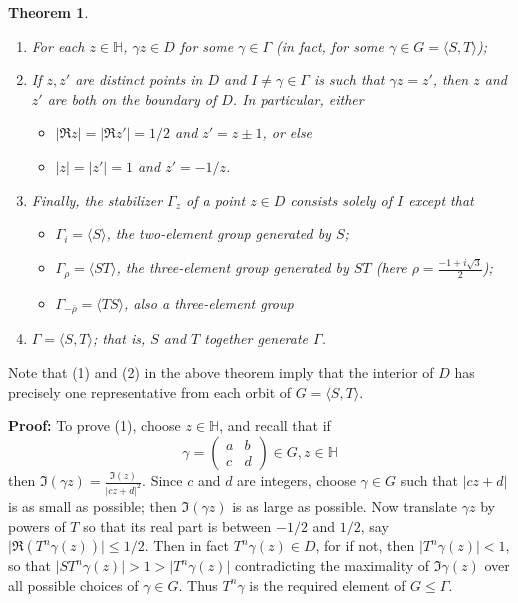 \documentclass[12pt]{article}
\newcommand{\Half}{\mathbb{H}}
\newtheorem{thm}{Theorem}
\begin{document}
\begin{thm}\ 
\newline
\begin{enumerate}
\item For each $z\in\Half$, $\gamma z\in D$ for some $\gamma\in\Gamma$ (in fact, for some $\gamma\in G=\langle S,T\rangle$);
\item If $z,z'$ are distinct points in $D$ and $I\neq\gamma\in\Gamma$ is such that $\gamma z=z'$, then $z$ and $z'$ are both on the boundary of $D$. In particular, either 
\begin{itemize}
\item $\lvert \Re z\rvert=\lvert \Re z'\rvert=1/2$ and $z'=z\pm 1$, or else
\item $\lvert z\rvert=\lvert z'\rvert=1$ and $z'=-1/z$.
\end{itemize}
\item Finally, the stabilizer $\Gamma_z$ of a point $z\in D$ consists solely of $I$ except that
\begin{itemize}
\item $\Gamma_i=\langle S\rangle$, the two-element group generated by $S$;
\item $\Gamma_{\rho}=\langle ST\rangle$, the three-element group generated by $ST$ (here $\displaystyle\rho=\frac{-1+i\sqrt{3}}{2}$);
\item $\Gamma_{-\overline{\rho}}=\langle TS\rangle$, also a three-element group
\end{itemize}
\item $\Gamma = \langle S,T\rangle$; that is, $S$ and $T$ together generate $\Gamma$.
\end{enumerate}
\end{thm}

Note that (1) and (2) in the above theorem imply that the interior of $D$ has precisely one representative from each orbit of $G=\langle S,T\rangle$.

\textbf{Proof:}
To prove (1), choose $z\in\Half$, and recall that if 
\[\gamma=\begin{pmatrix}a&b\\c&d\end{pmatrix}\in G, z\in\Half\]
then $\displaystyle\Im(\gamma z)=\frac{\Im(z)}{\lvert cz+d\rvert^2}$. Since $c$ and $d$ are integers, choose $\gamma\in G$ such that $\lvert cz+d\rvert$ is as small as possible; then $\Im(\gamma z)$ is as large as possible. Now translate $\gamma z$ by powers of $T$ so that its real part is between $-1/2$ and $1/2$, say $\lvert \Re(T^n\gamma(z))\rvert\leq 1/2$. Then in fact $T^n\gamma(z)\in D$, for if not, then $\lvert T^n\gamma(z)\rvert<1$, so that $\lvert ST^n\gamma(z)\rvert>1>\lvert T^n\gamma(z)\rvert$ contradicting the maximality of $\Im\gamma(z)$ over all possible choices of $\gamma\in G$. Thus $T^n\gamma$ is the required element of $G\leq \Gamma$.
\end{document}
